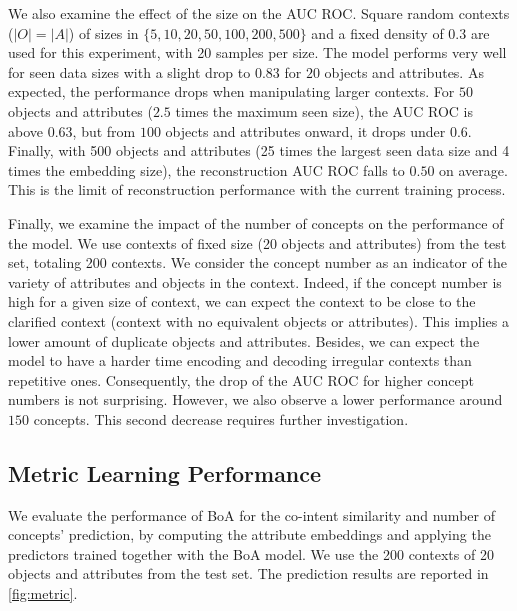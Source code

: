 We also examine the effect of the size on the AUC ROC.
Square random contexts ($|O|=|A|$) of sizes in $\{5,10,20,50,100,200,500\}$ and a fixed density of 0.3 are used for this experiment,
with 20 samples per size.
The model performs very well for seen data sizes with a slight drop to $0.83$ for $20$ objects and attributes.
As expected, the performance drops when manipulating larger contexts. %
For $50$ objects and attributes ($2.5$ times the maximum seen size), the AUC ROC is above $0.63$, but from $100$ objects and attributes onward, it drops under $0.6$.
Finally, with 500 objects and attributes (25 times the largest seen data size and 4 times the embedding size), the reconstruction AUC ROC falls to $0.50$ on average.
This is the limit of reconstruction performance with the current training process.

Finally, we examine the impact of the number of concepts on the performance of the model.
We use contexts of fixed size (20 objects and attributes) from the test set, totaling 200 contexts.
We consider the concept number as an indicator of the variety of attributes and objects in the context.
Indeed, if the concept number is high for a given size of context, we can expect the context to be close to the clarified context (context with no equivalent objects or attributes). This implies a lower amount of duplicate objects and attributes.
Besides, we can expect the model to have a harder time encoding and decoding irregular contexts than repetitive ones.
Consequently, the drop of the AUC ROC for higher concept numbers is not surprising.
However, we also observe a lower performance around $150$ concepts.
This second decrease requires further investigation.

\subsection{Metric Learning Performance}\label{sec:boa-metric-perf}
We evaluate the performance of BoA for the co-intent similarity and number of concepts' prediction, by computing the attribute embeddings and applying the predictors trained together with the BoA model.
We use the 200 contexts of 20 objects and attributes from the test set.
The prediction results are reported in \cref{fig:metric}.

